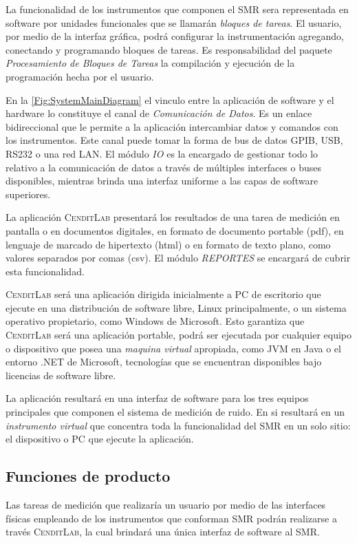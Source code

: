 \documentclass[paper=a4,oneside,fontsize=12pt]{article}
\newcommand{\AppName}{\textsc{CenditLab}\xspace}
\newcommand{\smr}{sistema de medición de ruido}
\newcommand{\SMR}{SMR\xspace}
\begin{document}
	La funcionalidad de los instrumentos que componen el \SMR sera representada en software por unidades funcionales que se llamarán  \emph{bloques de tareas}. El usuario, por medio de la interfaz gráfica, podrá configurar la instrumentación agregando, conectando y programando bloques de tareas. Es responsabilidad del paquete \emph{Procesamiento de Bloques de Tareas} la compilación y ejecución de la programación hecha por el usuario. 	

	En la \ref{Fig:SystemMainDiagram} el vinculo entre la aplicación de software y el hardware lo constituye el canal de \emph{Comunicación de Datos}. Es un enlace bidireccional que le permite a la aplicación intercambiar datos y comandos con los instrumentos. Este canal puede tomar la forma de bus de datos GPIB, USB, RS232 o una red LAN. El módulo \emph{IO} es la encargado de gestionar todo lo relativo a la comunicación de datos a través de múltiples interfaces o buses disponibles, mientras brinda una interfaz uniforme a las capas de software superiores.
	
	La aplicación \AppName presentará los resultados de una tarea de medición en pantalla o en documentos digitales, en formato de documento portable (pdf), en lenguaje de marcado de hipertexto (html) o en formato de texto plano, como valores separados por comas (csv). El módulo \emph{REPORTES} se encargará de cubrir esta funcionalidad.
	
	\AppName será una aplicación dirigida inicialmente a PC de escritorio que ejecute en una distribución de software libre, Linux principalmente, o un sistema operativo propietario, como Windows de Microsoft. Esto garantiza que \AppName será una aplicación portable, podrá ser ejecutada por cualquier equipo o dispositivo que posea una \emph{maquina virtual} apropiada, como JVM en Java o el entorno .NET de Microsoft, tecnologías que se encuentran disponibles bajo licencias de software libre.
	
	La aplicación resultará en una interfaz de software para los tres equipos principales que componen el \smr. En si resultará en un \emph{instrumento virtual} que concentra toda la funcionalidad del \SMR en un solo sitio: el dispositivo o PC que ejecute la aplicación.
	
	\subsection{Funciones de producto}
	
	Las tareas de medición que realizaría un usuario por medio de las interfaces físicas empleando de los instrumentos que conforman \SMR podrán realizarse a través \AppName, la cual brindará una única interfaz de software al \SMR. 
	
\end{document}
